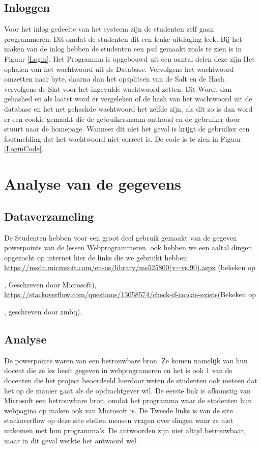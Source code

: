 \documentclass[11pt]{article}
\begin{document}
	\subsection{Inloggen}
	Voor het inlog gedeelte van het systeem zijn de studenten zelf gaan programmeren. Dit omdat de studenten dit een leuke uitdaging leek. Bij het maken van de inlog hebben de studenten een psd gemaakt zoals te zien is in Figuur \ref{Login}. Het Programma is opgebouwd uit een aantal delen deze zijn Het ophalen van het wachtwoord uit de Database. Vervolgens het wachtwoord omzetten naar byte, daarna dan het opsplitsen van de Salt en de Hash. vervolgens de Slat voor het ingevulde wachtwoord zetten. Dit Wordt dan gehashed en als laatst word er vergeleken of de hash van het wachtwoord uit de database en het net gehashde wachtwoord het zelfde zijn, als dit zo is dan word er een cookie gemaakt die de gebruikersnaam onthoud en de gebruiker door stuurt naar de homepage. Wanneer dit niet het geval is krijgt de gebruiker een foutmelding dat het wachtwoord niet correct is. De code is te zien in Figuur \ref{LoginCode}.
	\newpage
	
	\section{Analyse van de gegevens}
	
	\subsection{Dataverzameling}
	De Studenten hebben voor een groot deel gebruik gemaakt van de gegeven powerpoints van de lessen Webprogrammeren. ook hebben we een aaltal dingen opgezocht op internet hier de links die we gebruikt hebben: \url{https://msdn.microsoft.com/en-us/library/ms525800(v=vs.90).aspx} (bekeken op \date{19-01-2018}, Geschreven door Microsoft), \newline \url{https://stackoverflow.com/questions/13058574/check-if-cookie-exists}(Bekeken op \date{19-01-2018}, geschreven door zmbq).
	
	\subsection{Analyse}
	De powerpoints waren van een betrouwbare bron. Ze komen namelijk van hun docent die ze les heeft gegeven in webprogrameren en het is ook 1 van de docenten die het project beoordeeld hierdoor weten de studenten ook meteen dat het op de manier gaat als de opdrachtgever wil. De eerste link is afkomstig van Microsoft een betrouwbare bron, omdat het programma waar de studenten hun webpagina op maken ook van Microsoft is. De Tweede links is van de site stackoverflow op deze site stellen mensen vragen over dingen waar ze niet uitkomen met hun programma's. De antwoorden zijn niet altijd betrouwbaar, maar in dit geval werkte het antwoord wel.
\end{document}
